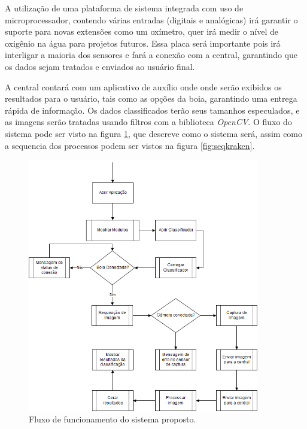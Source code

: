 A utilização de uma plataforma de sistema integrada com uso de microprocessador, contendo várias entradas (digitais e analógicas) irá garantir o suporte para novas extensões como um oxímetro, quer irá medir o nível de oxigênio na água para projetos futuros. Essa placa será importante pois irá interligar a maioria dos sensores e fará a conexão com a central, garantindo que os dados sejam tratados e enviados ao usuário final.

A central contará com um aplicativo de auxílio onde onde serão exibidos os resultados para o usuário, tais como as opções da boia, garantindo uma entrega rápida de informação. Os dados classificados terão seus tamanhos especulados, e as imagens serão tratadas usando filtros com a biblioteca \textit{OpenCV}. O fluxo do sistema pode ser visto na figura \ref{fig:fluxfish}, que descreve como o sistema será, assim como a sequencia dos processos podem ser vistos na figura \ref{fig:seqkraken}.

\begin{figure}[ht]
	\caption{\label{fig:fluxfish}  Fluxo de funcionamento do sistema proposto.}
	 \begin{center}
		\includegraphics[width = 0.9\textwidth]			{resources/fluxogeral}
    \end{center}
\end{figure}

